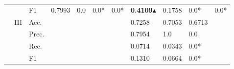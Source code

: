 \begin{tabular}{cclllllllll}
                                                                                           &                                   & F1                                                   & 0.7993                  & 0.0                     & 0.0*                         & 0.0*                    & \textbf{0.4109}$\blacktriangle$                                                                        & 0.1758                                                                      & 0.0*                                      & 0.0*                                      \\ 
    \cmidrule{2-11}
                                                                                           & \multirow{4}{*}{III}              & Acc.                                                 &                         &                         &                              &                         & 0.7258                                                                       & 0.7053                                                                      & 0.6713                                    &                                           \\
                                                                                           &                                   & Prec.                                                &                         &                         &                              &                         & 0.7954                                                                       & 1.0                                                                         & 0.0                                       &                                           \\
                                                                                           &                                   & Rec.                                                 &                         &                         &                              &                         & 0.0714                                                                       & 0.0343                                                                      & 0.0*                                      &                                           \\
                                                                                           &                                   & F1                                                   &                         &                         &                              &                         & 0.1310                                                                       & 0.0664                                                                      & 0.0*                                      &                                           \\
    \bottomrule
    \end{tabular}